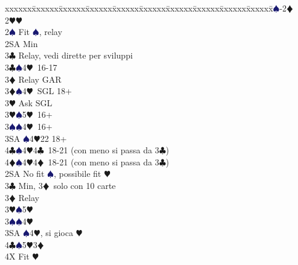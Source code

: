 \documentclass[a4paper,italian]{article}
\newcommand{\BC}{\textcolor{OliveGreen}{$\clubsuit$}}
\newcommand{\BD}{\textcolor{RedOrange}{$\vardiamondsuit$}}
\newcommand{\BH}{\textcolor{Red2}{$\varheartsuit${}}}
\newcommand{\BS}{\textcolor{MidnightBlue}{$\spadesuit${}}}
\newenvironment{bidtable}
{\begin{tabbing}

    xxxxxx\=xxxxxx\=xxxxxx\=xxxxxx\=xxxxxx\=xxxxxx\=xxxxxx\=xxxxxx\=xxxxxx\=xxxxxx\=\kill}
{\end{tabbing} }%
\begin{document}
                                    \begin{multicols}{2}
                                        \begin{bidtable}
                                            1\BS-2\BD\\
                                            2\BH {}\BH \+\\
                                            2\BS \> Fit \BS , relay\+\\
                                            2SA \> Min\+\\
                                            3\BC \> Relay, vedi dirette per sviluppi\-\\
                                            3\BC {}\BS 4\BH\ 16-17\+\\
                                            3\BD \> Relay GAR\-\\
                                            3\BD {}\BS 4\BH\ SGL 18+\+\\
                                            3\BH \> Ask SGL\-\\
                                            3\BH {}\BS 5\BH\ 16+\\
                                            3\BS {}\BS 4\BH\ 16+\\
                                            3SA \BS 4\BH 22 18+\\
                                            4\BC {}\BS 4\BH 4\BC\ 18-21 (con meno si passa da 3\BC )\\
                                            4\BD {}\BS 4\BH 4\BD\ 18-21 (con meno si passa da 3\BC )\-\\
                                            2SA \> No fit \BS , possibile fit \BH \+\\
                                            3\BC \> Min, 3\BD\ solo con 10 carte\+\\
                                            3\BD \> Relay\+\\
                                            3\BH {}\BS 5\BH \\
                                            3\BS {}\BS 4\BH \\
                                            3SA \BS 4\BH , si gioca \BH \\
                                            4\BC {}\BS5\BH3\BD \+\\
                                            4X \> Fit \BH\\

\end{bidtable}
\end{multicols}
\end{document}
